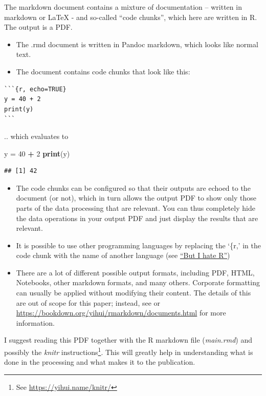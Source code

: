 \documentclass[11pt,]{article}
\newenvironment{Shaded}{\begin{snugshade}}{\end{snugshade}}
\newcommand{\DecValTok}[1]{\textcolor[rgb]{0.00,0.00,0.81}{#1}}
\newcommand{\KeywordTok}[1]{\textcolor[rgb]{0.13,0.29,0.53}{\textbf{#1}}}
\newcommand{\NormalTok}[1]{#1}
\newcommand{\OperatorTok}[1]{\textcolor[rgb]{0.81,0.36,0.00}{\textbf{#1}}}
\newcommand{\StringTok}[1]{\textcolor[rgb]{0.31,0.60,0.02}{#1}}
\providecommand{\tightlist}{%
  \setlength{\itemsep}{0pt}\setlength{\parskip}{0pt}}
\let\rmarkdownfootnote\footnote%
\def\footnote{\protect\rmarkdownfootnote}
\begin{document}
The markdown document contains a mixture of documentation -- written in markdown or LaTeX - and so-called ``code chunks'', which here are written in R. The output is a PDF.

\begin{itemize}
\tightlist
\item
  The .rmd document is written in Pandoc markdown, which looks like normal text.
\item
  The document contains code chunks that look like this:
\end{itemize}

\begin{verbatim}
```{r, echo=TRUE}
y = 40 + 2
print(y) 
```
\end{verbatim}

.. which evaluates to

\begin{Shaded}
\begin{Highlighting}[]
\NormalTok{y =}\StringTok{ }\DecValTok{40} \OperatorTok{+}\StringTok{ }\DecValTok{2}
\KeywordTok{print}\NormalTok{(y) }
\end{Highlighting}
\end{Shaded}

\begin{verbatim}
## [1] 42
\end{verbatim}

\begin{itemize}
\tightlist
\item
  The code chunks can be configured so that their outputs are echoed to the document (or not), which in turn allows the output PDF to show only those parts of the data processing that are relevant. You can thus completely hide the data operations in your output PDF and just display the results that are relevant.
\item
  It is possible to use other programming languages by replacing the `\{r,' in the code chunk with the name of another language (see \protect\hyperlink{pleaseNotR}{``But I hate R''})
\item
  There are a lot of different possible output formats, including PDF, HTML, Notebooks, other markdown formats, and many others. Corporate formatting can usually be applied without modifying their content. The details of this are out of scope for this paper; instead, see \citep{R-Markdown-Guide} or \url{https://bookdown.org/yihui/rmarkdown/documents.html} for more information.
\end{itemize}

I suggest reading this PDF together with the R markdown file (\emph{main.rmd}) and possibly the \emph{knitr} instructions\footnote{See \url{https://yihui.name/knitr/}}. This will greatly help in understanding what is done in the processing and what makes it to the publication.
\end{document}
